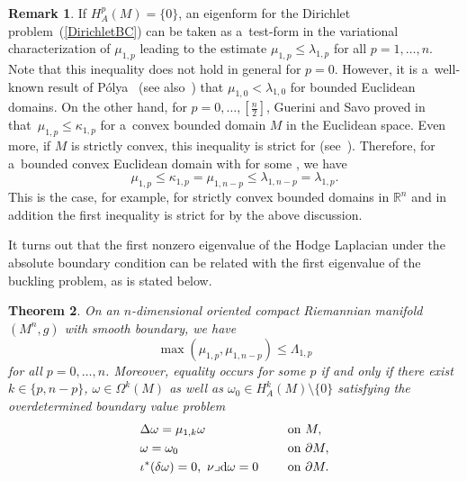 \documentclass[10pt,a4paper]{amsart}
\numberwithin{equation}{section}
\newtheorem{Theorem}{Theorem}[section]
\theoremstyle{definition}
\newtheorem{Remark}[Theorem]{Remark}
\begin{document}
\begin{Remark}\label{RemarkPolya}
If $H_A^p(M)=\{0\}$, an eigenform for the Dirichlet problem~(\ref{DirichletBC}) can be taken as a~test-form in the variational characterization of $\mu_{1,p}$ leading to the estimate $\mu_{1,p}\leq\lambda_{1,p}$ for all $p=1,\dots,n$.
Note that this inequality does not hold in general for $p=0$.
However, it is a~well-known result of P\'olya~\cite{Polya1952} (see also~\cite{Friedlander91}) that $\mu_{1,0}<\lambda_{1,0}$ for bounded Euclidean domains.
On the other hand, for $p=0,\dots,[\frac{n}{2}]$, Guerini and Savo proved in~\cite[Theorem 2.6\,(b))]{GueriniSavo2004} that~${\mu_{1,p}\leq\kappa_{1,p}}$ for a~convex bounded domain $M$ in the Euclidean space.
Even more, if $M$ is strictly convex, this inequality is strict for  (see~\cite[Theorem 2.6\,(c))]{GueriniSavo2004}).
Therefore, for a~bounded convex Euclidean domain with  for some , we have
\[
\mu_{1,p}\leq \kappa_{1,p}=\mu_{1,n-p}\leq\lambda_{1,n-p}=\lambda_{1,p}.
\]
This is the case, for example, for strictly convex bounded domains in $\mathbb{R}^n$ and in addition the first inequality is strict for  by the above discussion.
\end{Remark}

It turns out that the first nonzero eigenvalue of the Hodge Laplacian under the absolute boundary condition can be related with the first eigenvalue of the buckling problem, as is stated below.

\begin{Theorem}\label{BuckAbs}
On an $n$-dimensional oriented compact Riemannian manifold $(M^n,g)$ with smooth boundary, we have
\begin{equation}\label{BuckAbs1}
\max(\mu_{1,p},\mu_{1,n-p})\leq\Lambda_{1,p}
\end{equation}
for all $p=0,\dots,n$. Moreover, equality occurs for some $p$ if and only if there exist $k\in\{p,n-p\}$, $\omega\in\Omega^k(M)$ as well as $\omega_0\in H_A^k(M)\setminus\{0\}$ satisfying the overdetermined boundary value problem%
\begin{equation}\label{ODP}
\begin{aligned}
&\Delta \omega =\mu_{1,k} \omega \ \quad&&\textrm{on } M, \\
&\omega = \omega_0 \ \quad&& \textrm{on }\partial M,\\
&\iota^*(\delta\omega) =0,\ \nu\lrcorner {\rm d}\omega =0 \ \quad&& \textrm{on }\partial M.
\end{aligned}
\end{equation}
\end{Theorem}
\end{document}
